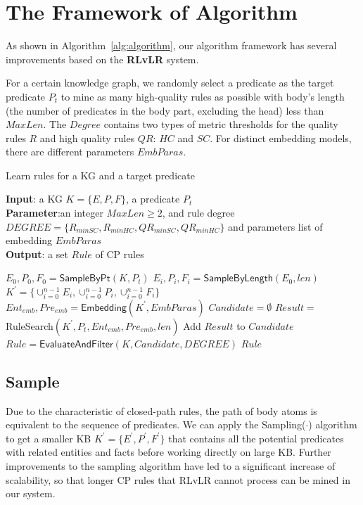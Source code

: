 \documentclass{article}
\begin{document}
	\section{The Framework of Algorithm}
	As shown in Algorithm~\ref{alg:algorithm}, our algorithm framework has several improvements based on the {\bf RLvLR} system.
	
	For a certain knowledge graph, we randomly select a predicate as the target predicate $P_t$ to mine as many high-quality rules as possible with body's length (the number of predicates in the body part, excluding the head) less than $MaxLen$. The $Degree$ contains two types of metric thresholds for the quality rules $R$ and high quality rules $QR$: $HC$ and $SC$. For distinct embedding models, there are different parameters $EmbParas$. 
	\begin{algorithm}[tb]
		\caption{Learn rules for a KG and a target predicate}
		\label{alg:algorithm}
		\textbf{Input}: a KG $K=\{E, P, F\}$, a predicate $P_t$\\
		\textbf{Parameter}:an integer $MaxLen \geq 2$, and rule degree \\
		$DEGREE = \{ R_{minSC}, R_{minHC}, QR_{minSC}, QR_{minHC}\} $ 
		and parameters list of embedding $EmbParas$\\
		\textbf{Output}: a set $Rule$ of CP rules
		\begin{algorithmic}[1] %
			\STATE $E_0, P_0, F_0 = \textsf{SampleByPt}(K, P_t)$
			\STATE $E_i, P_i, F_i = \textsf{SampleByLength}(E_0, len)$
			\STATE $K^{'} = \{ \cup^{n-1}_{i=0}E_i, \cup^{n-1}_{i=0}P_i, \cup^{n-1}_{i=0}F_i \}$
			\STATE $Ent_{emb}, Pre_{emb} =\textsf{Embedding} (K^{'}, EmbParas)$
			\STATE $Candidate = \emptyset$	
			\STATE $Result=$\textsf{RuleSearch}$(K^{'}, P_t, Ent_{emb}, Pre_{emb},len)$
			\STATE Add $Result$ to $Candidate$
			\ENDFOR
		\STATE $Rule=\textsf{EvaluateAndFilter}(K,Candidate,DEGREE)$
		\RETURN $Rule$
		\end{algorithmic}
	\end{algorithm}

	\subsection{Sample}  
	Due to the characteristic of closed-path rules, the path of body atoms is equivalent to the sequence of predicates. We can apply the \textsf{Sampling($\cdot$)} algorithm to get a smaller KB $K^{'}=\{E^{'}, P^{'}, F^{'}\}$ that contains all the potential predicates with related entities and facts before working directly on large KB. Further improvements to the sampling algorithm have led to a significant increase of scalability, so that longer CP rules that RLvLR cannot process can be mined in our system.
	
\end{document}

